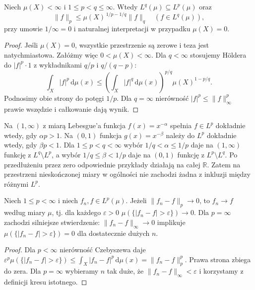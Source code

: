 \begin{twierdzenie}
\label{thm:lp-embedding-finite-14}
Niech $\mu(X)<\infty$ i $1\le p<q\le\infty$.
Wtedy $L^q(\mu)\subseteq L^p(\mu)$ oraz
\begin{equation}\label{eq:finite-embedding-14}
\|f\|_p\le\mu(X)^{\,1/p-1/q}\|f\|_q
\quad(f\in L^q(\mu)),
\end{equation}
przy umowie $1/\infty=0$ i naturalnej interpretacji
w przypadku $\mu(X)=0$.
\end{twierdzenie}
\begin{proof}
Jeśli $\mu(X)=0$, wszystkie przestrzenie są
zerowe i teza jest natychmiastowa. Załóżmy więc
$0<\mu(X)<\infty$.
Dla $q<\infty$ stosujemy Höldera do
$|f|^p\cdot1$ z wykładnikami $q/p$ i $q/(q-p)$:
\[
\int_X|f|^p\,\mathrm d\mu(x)
\le\left(\int_X|f|^q\,\mathrm d\mu(x)\right)^{p/q}
\mu(X)^{1-p/q}.
\]
Podnosimy obie strony do potęgi $1/p$.
Dla $q=\infty$ nierówność
$|f|^p\le\|f\|_\infty^p$ prawie wszędzie
i całkowanie dają wynik.
\end{proof}

\begin{przyklad}
Na $(1,\infty)$ z miarą Lebesgue'a
funkcja $f(x)=x^{-\alpha}$ spełnia
$f\in L^p$ dokładnie wtedy, gdy $\alpha p>1$.
Na $(0,1)$ funkcja $g(x)=x^{-\beta}$
należy do $L^p$ dokładnie wtedy, gdy $\beta p<1$.
Dla $1\le p<q<\infty$ wybór
$1/q<\alpha\le1/p$ daje na $(1,\infty)$
funkcję z $L^q\setminus L^p$,
a wybór $1/q\le\beta<1/p$ daje na $(0,1)$
funkcję z $L^p\setminus L^q$.
Po przedłużeniu przez zero odpowiednie przykłady
działają na całej $\mathbb R$.
Zatem na przestrzeni nieskończonej miary
w ogólności nie zachodzi żadna z inkluzji między
różnymi $L^p$.
\end{przyklad}

\begin{twierdzenie}
\label{thm:lp-to-measure-14}
Niech $1\le p<\infty$ i niech $f_n,f\in L^p(\mu)$.
Jeżeli $\|f_n-f\|_p\to0$, to $f_n\to f$
według miary $\mu$, tj. dla każdego $\varepsilon>0$
$\mu(\{|f_n-f|>\varepsilon\})\to0$.
Dla $p=\infty$ zachodzi silniejsze stwierdzenie:
$\|f_n-f\|_\infty\to0$ implikuje
$\mu(\{|f_n-f|>\varepsilon\})=0$ dla dostatecznie
dużych $n$.
\end{twierdzenie}
\begin{proof}
Dla $p<\infty$ nierówność Czebyszewa daje
$\varepsilon^p\mu(\{|f_n-f|>\varepsilon\})
\le\int_X|f_n-f|^p\,\mathrm d\mu(x)=\|f_n-f\|_p^p$.
Prawa strona zbiega do zera.
Dla $p=\infty$ wybieramy $n$ tak duże, że
$\|f_n-f\|_\infty<\varepsilon$ i korzystamy
z definicji kresu istotnego.
\end{proof}

